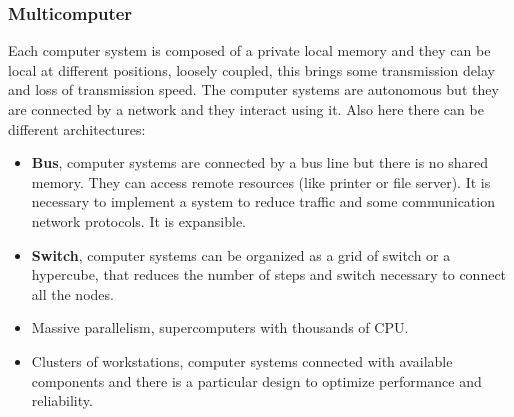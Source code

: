 \subsubsection{Multicomputer}
Each computer system is composed of a private local memory and they can be local at different positions, loosely coupled, this brings some transmission delay and loss of transmission speed. The computer systems are autonomous but they are connected by a network and they interact using it. Also here there can be different architectures:
\begin{itemize}
    \item \textbf{Bus}, computer systems are connected by a bus line but there is no shared memory. They can access remote resources (like printer or file server). It is necessary to implement a system to reduce traffic and some communication network protocols. It is expansible.
    \item \textbf{Switch}, computer systems can be organized as a grid of switch or a hypercube, that reduces the number of steps and switch necessary to connect all the nodes.
    \item Massive parallelism, supercomputers with thousands of CPU.
    \item Clusters of workstations, computer systems connected with available components and there is a particular design to optimize performance and reliability. 
\end{itemize}

